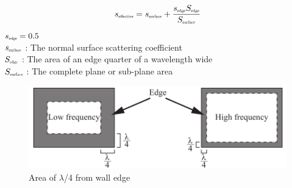 \vspace{0.8cm}

\begin{table}[htbp]
\begin{equation}
 \label{eq:付加乱反射率計算式}
 s_{\scalebox{0.5}{effective}} = s_{\scalebox{0.5}{surface}} + \frac{s_{\scalebox{0.5}{edge}}
 S_{\scalebox{0.5}{edge}}}{S_{\scalebox{0.5}{surface}}}\\
\end{equation}
\hspace{2cm}$s_{\scalebox{0.5}{edge}} = 0.5$\\
\hspace{2cm}$s_{\scalebox{0.5}{surface}}$ : The normal surface scattering coefficient\\
\hspace{2cm}$S_{\scalebox{0.5}{edge}}$ : The area of an edge quarter of a wavelength wide\\
\hspace{2cm}$S_{\scalebox{0.5}{surface}}$ : The complete plane or sub-plane area\\
\end{table}

\begin{figure}[htbp]
    \centering
    \includegraphics[keepaspectratio,scale=0.8]{02_att/edge.pdf}
    \caption{\hspace{1mm}Area of $\lambda$/4 from wall edge}
    \label{fig:壁面端部}
\end{figure}

